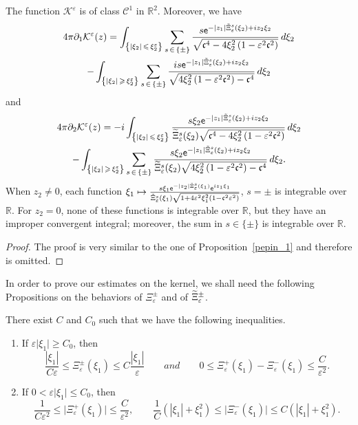 \documentclass[10pt]{amsart}
\theoremstyle{definition}\newtheorem{defi}[theo]{Definition}\newtheorem{rema}[theo]{Remark}\newtheorem{exam}[theo]{Example}\newtheorem{exem}[theo]{Example}\newtheorem{nota}[theo]{Notation}
\newcommand*\p{\partial}
\newcommand*\R{\mathbb R}
\newcommand*\BC{\mathcal{C}}
\newcommand*\BK{\mathcal{K}}
\newcommand*\ex{{\sf e}}
\newcommand*\cs{{\mathfrak c}}
\newcommand*\gs{\geqslant }
\newcommand*\ls{\leqslant }
\newcommand*\e{\varepsilon}
\renewcommand*\t{\tilde}
\newcommand*{\romanenumi}{\renewcommand*{\theenumi}{\roman{enumi}}}
\let\oldtilde\tilde
\renewcommand*{\tilde}[1]{\mathchoice{\widetilde{#1}}{\widetilde{#1}}{\oldtilde{#1}}{\oldtilde{#1}}}
\begin{document}
\begin{prop}\label{pepin_2}
The function $ \BK^\e $ is of class $ \BC^1 $ in $ \R^2 $. Moreover, we have
\begin{multline*}
4 \pi \p_1 \BK^\e (z)=
 \int_{\left\{ |\xi_2 | \,\ls\,\xi_2^\e \right\} } \sum_{s\,\in\,\{ \pm \} }
\frac{ s \ex^{- |z_1| \t\Xi_\e^s (\xi_2) + i z_2 \xi_2} }{
\sqrt{ \cs^4 - 4 \xi_2^2 \left(1 - \e^2 \cs^2\right)}} \, d\xi_2\\
 - \int_{\left\{ |\xi_2 |\,\gs\,\xi_2^\e \right\} } \sum_{s\,\in\,\{ \pm \} } \frac{i s \ex^{- |z_1| \t\Xi_\e^s (\xi_2) + i z_2 \xi_2} }{\sqrt{ 4 \xi_2^2 \left(1 - \e^2 \cs^2\right) - \cs^4 } } \, d\xi_2
\end{multline*}
and
\begin{multline*}
4 \pi \p_2 \BK^\e (z)  =
-i \int_{\left\{ |\xi_2 |\,\ls\,\xi_2^\e \right\}}
\frac{ s \xi_2 \ex^{- |z_1| \t\Xi_\e^s (\xi_2) + i z_2 \xi_2}}{\t\Xi_\e^s (\xi_2) \sqrt{ \cs^4 - 4 \xi_2^2 \left(1 - \e^2 \cs^2\right)}} \, d\xi_2\\
- \int_{\left\{ |\xi_2 |\,\gs\,\xi_2^\e \right\} } \sum_{s\,\in\,\{ \pm \}}
\frac{s \xi_2 \ex^{- |z_1| \t\Xi_\e^s (\xi_2) + i z_2 \xi_2}}{\t\Xi_\e^s (\xi_2) \sqrt{ 4 \xi_2^2 \left(1 - \e^2 \cs^2\right) - \cs^4}} \, d\xi_2.
\end{multline*}
When $ z_2 \neq 0 $, each function $ \xi_1 \mapsto \frac{ s \xi_1 \ex^{- |z_2| \t{\Xi}_\e^s (\xi_1)} \ex^{i z_1 \xi_1} }{\t{\Xi}_\e^s (\xi_1)
\sqrt{1 + 4\e^2 \xi_1^2 (1 - \cs^2 \e^2) } } $, $ s = \pm $ is integrable over $ \R $. For $ z_2 = 0 $, none of these functions is integrable over $ \R $, but they have an improper convergent integral; moreover, the sum in $s \in \{ \pm \} $ is integrable over $\R $.
\end{prop}

\begin{proof} 
The proof is very similar to the one of Proposition~\ref{pepin_1} and therefore is omitted.
\end{proof}


In order to prove our estimates on the kernel, we shall need the following Propositions on the behaviors of $ \Xi_\e^{\pm} $ and of $ \tilde{\Xi}_\e^{\pm} $.

\begin{prop}\label{asym_Z}
There exist $ C $ and $ C_0 $ such that we have the following inequalities.
\begin{enumerate}\romanenumi
\item\label{prop3.3.1} If $ \e \lvert \xi_1 \rvert \gs C_0 $, then
\[
\frac{| \xi_1|} {C \e } \ls \Xi_\e^\pm (\xi_1) \ls C \frac{| \xi_1|} {\e }
\quad \quad and \quad \quad 0 \ls \Xi_\e^+ (\xi_1) - \Xi_\e^- (\xi_1)
\ls \frac{ C} {\e^2 }.
\]

\item\label{prop3.3.2} If $ 0 < \e \lvert \xi_1 \rvert \ls C_0 $, then
\[
\frac{1}{C\e^2} \ls \lvert \Xi_\e^+ (\xi_1) \rvert \ls \frac{C}{\e^2},
\qquad
\frac{1}{C} \left(| \xi_1 | + \xi_1^2\right) \ls \lvert \Xi_\e^- (\xi_1) \rvert \ls C \left(| \xi_1 | + \xi_1^2\right).
\]
\end{enumerate}
\end{prop}
\end{document}
